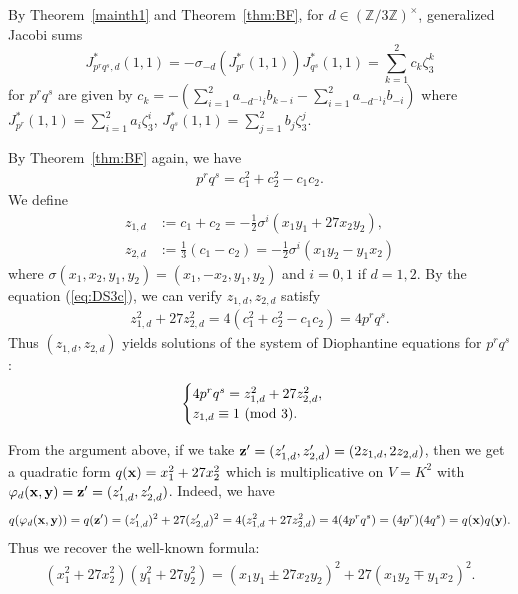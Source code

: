 \documentclass[a4paper, 11pt]{amsart}
\newcommand{\Z}{\mathbb Z}
\theoremstyle{plain}
\theoremstyle{definition}
\numberwithin{equation}{section}
\begin{document}
By Theorem~\ref{mainth1} and Theorem~\ref{thm:BF},
for $d\in(\Z/3\Z)^{\times}$, 
generalized Jacobi sums
\[
J^\ast_{p^rq^s,d}(1,1)=-\sigma_{-d}(J^\ast_{p^r}(1,1))J^\ast_{q^s}(1,1)=\sum_{k=1}^{2}c_k\zeta_3^k
\]
for $p^rq^s$ are given by
$c_k=-(\sum_{i=1}^{2}a_{-d^{-1}i}b_{k-i} - \sum_{i=1}^{2}a_{-d^{-1}i}b_{-i})$ 
where $J^\ast_{p^r}(1,1)=\sum_{i=1}^2 a_i\zeta_3^i$, 
$J^\ast_{q^s}(1,1)=\sum_{j=1}^2 b_j\zeta_3^j$. 

By Theorem~\ref{thm:BF} again, we have
\begin{align}\label{eq:DS3c}
p^rq^s=c_1^2+c_2^2-c_1c_2.
\end{align}
We define
\begin{align*}
z_{1,d}&:=c_1+c_2=-\frac{1}{2}\sigma^i(x_1y_1+27x_2y_2),\\
z_{2,d}&:=\frac{1}{3}\left(c_1-c_2\right)=-\frac{1}{2}\sigma^i(x_1y_2-y_1 x_2)
\end{align*}
where $\sigma(x_1,x_2,y_1,y_2)=(x_1,-x_2,y_1,y_2)$ and $i=0,1$ if $d=1,2$. 
By the
equation (\ref{eq:DS3c}), we can verify $z_{1,d}, z_{2,d}$ satisfy
\begin{align*}
z_{1,d}^2+27z_{2,d}^2
=4(c_1^2+c_2^2-c_1c_2)
=4p^rq^s.
\end{align*} 
Thus $(z_{1,d},z_{2,d})$ yields solutions of the system of Diophantine equations for $p^rq^s$:
\begin{align*}
\begin{cases}
4p^rq^s=z_{1,d}^2+27z_{2,d}^2,\\
z_{1,d}\equiv 1\ ({\rm mod}\ 3).
\end{cases}
\end{align*}

From the argument above, if we take
${\bf z}^\prime=(z_{1,d}^{\prime}, z_{2,d}^{\prime}) = (2z_{1,d}, 2z_{2,d})$, 
then we get a quadratic form $q({\bf x})=x_1^2+27x_2^2$ which 
is multiplicative on $V=K^2$ with 
$\varphi_d ({\bf x}, {\bf y})={\bf z}^\prime=(z_{1,d}^{\prime}, z_{2,d}^{\prime})$. 
Indeed, we have
\begin{align*}
q(\varphi_d ({\bf x}, {\bf y}))=q({\bf z}^\prime)
=(z_{1,d}^{\prime})^2+27(z_{2,d}^{\prime})^2
=4(z_{1,d}^2+27z_{2,d}^2)
=4(4p^rq^s)
=(4p^r)(4q^s)
=q({\bf x})q({\bf y}).
\end{align*}
Thus we recover the well-known formula:
\begin{align*}
(x_1^2+27x_2^2)(y_1^2+27y_2^2)=(x_1y_1\pm 27 x_2y_2)^2+27(x_1y_2\mp y_1x_2)^2. 
\end{align*}
\end{document}
